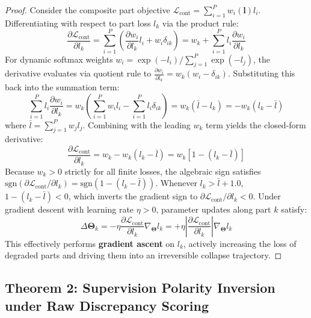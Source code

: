 \begin{proof}
Consider the composite part objective $\mathcal{L}_{\text{cont}} = \sum_{i=1}^P w_i(\mathbf{l}) l_i$. Differentiating with respect to part loss $l_k$ via the product rule:
\begin{equation}
\frac{\partial \mathcal{L}_{\text{cont}}}{\partial l_k} = \sum_{i=1}^P \left( \frac{\partial w_i}{\partial l_k} l_i + w_i \delta_{ik} \right) = w_k + \sum_{i=1}^P l_i \frac{\partial w_i}{\partial l_k}
\end{equation}
For dynamic softmax weights $w_i = \exp(-l_i) / \sum_{j=1}^P \exp(-l_j)$, the derivative evaluates via quotient rule to $\frac{\partial w_i}{\partial l_k} = w_k(w_i - \delta_{ik})$. Substituting this back into the summation term:
\begin{equation}
\sum_{i=1}^P l_i \frac{\partial w_i}{\partial l_k} = w_k \left( \sum_{i=1}^P w_i l_i - \sum_{i=1}^P l_i \delta_{ik} \right) = w_k(\bar{l} - l_k) = -w_k(l_k - \bar{l})
\end{equation}
where $\bar{l} = \sum_{j=1}^P w_j l_j$. Combining with the leading $w_k$ term yields the closed-form derivative:
\begin{equation}
\frac{\partial \mathcal{L}_{\text{cont}}}{\partial l_k} = w_k - w_k(l_k - \bar{l}) = w_k \left[ 1 - (l_k - \bar{l}) \right]
\end{equation}
Because $w_k > 0$ strictly for all finite losses, the algebraic sign satisfies $\text{sgn}(\partial \mathcal{L}_{\text{cont}} / \partial l_k) = \text{sgn}(1 - (l_k - \bar{l}))$.
Whenever $l_k > \bar{l} + 1.0$, $1 - (l_k - \bar{l}) < 0$, which inverts the gradient sign to $\partial \mathcal{L}_{\text{cont}} / \partial l_k < 0$. Under gradient descent with learning rate $\eta > 0$, parameter updates along part $k$ satisfy:
\begin{equation}
\Delta \mathbf{\Theta}_k = -\eta \frac{\partial \mathcal{L}_{\text{cont}}}{\partial l_k} \nabla_{\mathbf{\Theta}} l_k = +\eta \left|\frac{\partial \mathcal{L}_{\text{cont}}}{\partial l_k}\right| \nabla_{\mathbf{\Theta}} l_k
\end{equation}
This effectively performs \textbf{gradient ascent} on $l_k$, actively increasing the loss of degraded parts and driving them into an irreversible collapse trajectory.
\end{proof}

\subsection{Theorem 2: Supervision Polarity Inversion under Raw Discrepancy Scoring}
\label{subsec:thm2}

